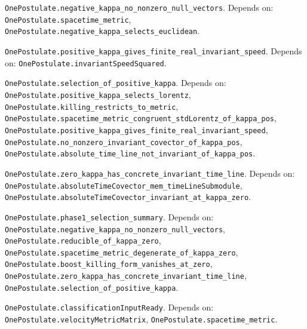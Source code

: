 \begin{lemma}\label{OnePostulate.negative_kappa_no_nonzero_null_vectors}
\texttt{OnePostulate.negative\_kappa\_no\_nonzero\_null\_vectors}. Depends on: \texttt{OnePostulate.spacetime\_metric}, \texttt{OnePostulate.negative\_kappa\_selects\_euclidean}.
\end{lemma}

\begin{lemma}\label{OnePostulate.positive_kappa_gives_finite_real_invariant_speed}
\texttt{OnePostulate.positive\_kappa\_gives\_finite\_real\_invariant\_speed}. Depends on: \texttt{OnePostulate.invariantSpeedSquared}.
\end{lemma}

\begin{lemma}\label{OnePostulate.selection_of_positive_kappa}
\texttt{OnePostulate.selection\_of\_positive\_kappa}. Depends on: \texttt{OnePostulate.positive\_kappa\_selects\_lorentz}, \texttt{OnePostulate.killing\_restricts\_to\_metric}, \texttt{OnePostulate.spacetime\_metric\_congruent\_stdLorentz\_of\_kappa\_pos}, \texttt{OnePostulate.positive\_kappa\_gives\_finite\_real\_invariant\_speed}, \texttt{OnePostulate.no\_nonzero\_invariant\_covector\_of\_kappa\_pos}, \texttt{OnePostulate.absolute\_time\_line\_not\_invariant\_of\_kappa\_pos}.
\end{lemma}

\begin{lemma}\label{OnePostulate.zero_kappa_has_concrete_invariant_time_line}
\texttt{OnePostulate.zero\_kappa\_has\_concrete\_invariant\_time\_line}. Depends on: \texttt{OnePostulate.absoluteTimeCovector\_mem\_timeLineSubmodule}, \texttt{OnePostulate.absoluteTimeCovector\_invariant\_at\_kappa\_zero}.
\end{lemma}

\begin{lemma}\label{OnePostulate.phase1_selection_summary}
\texttt{OnePostulate.phase1\_selection\_summary}. Depends on: \texttt{OnePostulate.negative\_kappa\_no\_nonzero\_null\_vectors}, \texttt{OnePostulate.reducible\_of\_kappa\_zero}, \texttt{OnePostulate.spacetime\_metric\_degenerate\_of\_kappa\_zero}, \texttt{OnePostulate.boost\_killing\_form\_vanishes\_at\_zero}, \texttt{OnePostulate.zero\_kappa\_has\_concrete\_invariant\_time\_line}, \texttt{OnePostulate.selection\_of\_positive\_kappa}.
\end{lemma}

\begin{definition}\label{OnePostulate.classificationInputReady}
\texttt{OnePostulate.classificationInputReady}. Depends on: \texttt{OnePostulate.velocityMetricMatrix}, \texttt{OnePostulate.spacetime\_metric}.
\end{definition}

